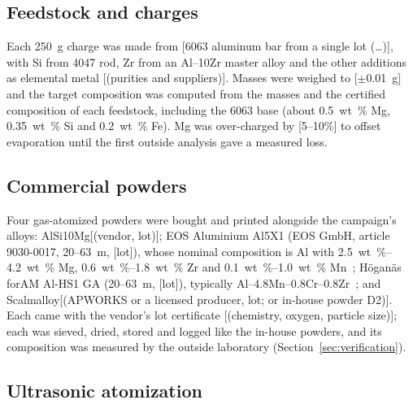 \documentclass[preprint,12pt]{elsarticle}
\newcommand{\note}[1]{}
\newcommand{\note}[1]{\textcolor{blue!70!black}{\textsf{\footnotesize [Note: #1]}}}
\newcommand{\placeholder}[1]{\textcolor{red!75!black}{[#1]}}
\newcommand{\Scal}{Scalmalloy\xspace}
\newcommand{\AlSi}{AlSi10Mg\xspace}
\begin{document}
\subsection{Feedstock and charges}

Each \SI{250}{g} charge was made from \placeholder{6063 aluminum bar from a single lot (\dots)}, with Si from 4047 rod, Zr from an Al--10Zr master alloy and the other additions as elemental metal \placeholder{(purities and suppliers)}.
Masses were weighed to \placeholder{$\pm$0.01~g} and the target composition was computed from the masses and the certified composition of each feedstock, including the 6063 base (about \SI{0.5}{wt\%} Mg, \SI{0.35}{wt\%} Si and \SI{0.2}{wt\%} Fe).
Mg was over-charged by \placeholder{5--10\%} to offset evaporation until the first outside analysis gave a measured loss.

\subsection{Commercial powders}
\label{sec:commercial}

Four gas-atomized powders were bought and printed alongside the campaign's alloys: \AlSi \placeholder{(vendor, lot)}; EOS Aluminium Al5X1 (EOS GmbH, article 9030-0017, 20--63~\textmu m, \placeholder{lot}), whose nominal composition is Al with \SIrange{2.5}{4.2}{wt\%} Mg, \SIrange{0.6}{1.8}{wt\%} Zr and \SIrange{0.1}{1.0}{wt\%} Mn~\cite{mds_al5x1}; H\"ogan\"as forAM Al-HS1 GA (20--63~\textmu m, \placeholder{lot}), typically Al--4.8Mn--0.8Cr--0.8Zr~\cite{ds_hoganas}; and \Scal \placeholder{(APWORKS or a licensed producer, lot; or in-house powder D2)}.
Each came with the vendor's lot certificate \placeholder{(chemistry, oxygen, particle size)}; each was sieved, dried, stored and logged like the in-house powders, and its composition was measured by the outside laboratory (Section~\ref{sec:verification}).
\note{Nothing is ordered yet. Sourcing, the questions for each vendor and a draft quote request are in ../baselines.md; neither vendor publishes a price or lead time. Al-HS1 and Scalmalloy are optional; Al5X1 is the one the front needs.}

\subsection{Ultrasonic atomization}
\label{sec:atomization}
\end{document}
